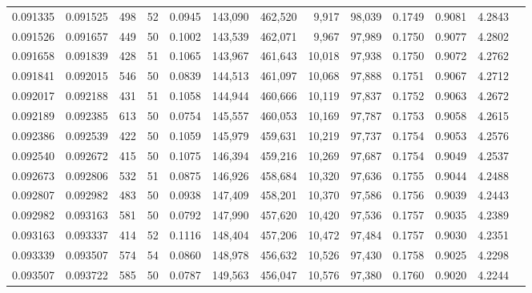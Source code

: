 \begin{tabular}{rrrrrrrrrrrrr}
0.091335 & 0.091525 &   498 &  52 &                                     0.0945 & 143,090 & 462,520 &   9,917 &  98,039 & 0.1749 & 0.9081 & 4.2843 \\
0.091526 & 0.091657 &   449 &  50 &                                     0.1002 & 143,539 & 462,071 &   9,967 &  97,989 & 0.1750 & 0.9077 & 4.2802 \\
0.091658 & 0.091839 &   428 &  51 &                                     0.1065 & 143,967 & 461,643 &  10,018 &  97,938 & 0.1750 & 0.9072 & 4.2762 \\
0.091841 & 0.092015 &   546 &  50 &                                     0.0839 & 144,513 & 461,097 &  10,068 &  97,888 & 0.1751 & 0.9067 & 4.2712 \\
0.092017 & 0.092188 &   431 &  51 &                                     0.1058 & 144,944 & 460,666 &  10,119 &  97,837 & 0.1752 & 0.9063 & 4.2672 \\
0.092189 & 0.092385 &   613 &  50 &                                     0.0754 & 145,557 & 460,053 &  10,169 &  97,787 & 0.1753 & 0.9058 & 4.2615 \\
0.092386 & 0.092539 &   422 &  50 &                                     0.1059 & 145,979 & 459,631 &  10,219 &  97,737 & 0.1754 & 0.9053 & 4.2576 \\
0.092540 & 0.092672 &   415 &  50 &                                     0.1075 & 146,394 & 459,216 &  10,269 &  97,687 & 0.1754 & 0.9049 & 4.2537 \\
0.092673 & 0.092806 &   532 &  51 &                                     0.0875 & 146,926 & 458,684 &  10,320 &  97,636 & 0.1755 & 0.9044 & 4.2488 \\
0.092807 & 0.092982 &   483 &  50 &                                     0.0938 & 147,409 & 458,201 &  10,370 &  97,586 & 0.1756 & 0.9039 & 4.2443 \\
0.092982 & 0.093163 &   581 &  50 &                                     0.0792 & 147,990 & 457,620 &  10,420 &  97,536 & 0.1757 & 0.9035 & 4.2389 \\
0.093163 & 0.093337 &   414 &  52 &                                     0.1116 & 148,404 & 457,206 &  10,472 &  97,484 & 0.1757 & 0.9030 & 4.2351 \\
0.093339 & 0.093507 &   574 &  54 &                                     0.0860 & 148,978 & 456,632 &  10,526 &  97,430 & 0.1758 & 0.9025 & 4.2298 \\
0.093507 & 0.093722 &   585 &  50 &                                     0.0787 & 149,563 & 456,047 &  10,576 &  97,380 & 0.1760 & 0.9020 & 4.2244 \\

\end{tabular}

